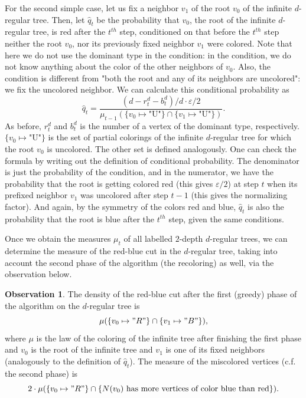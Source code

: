 \documentclass{article}
\theoremstyle{definition}
\newtheorem{observation}[definition]{Observation}
\newcommand{\eps}{\varepsilon}
\begin{document}
For the second simple case, let us fix a neighbor $v_1$ of the root $v_0$ of the infinite $d$-regular tree. Then, let $\hat q_t$ be the probability that $v_0$, the root of the infinite $d$-regular tree, is red after the $t^{th}$ step, conditioned on that before the $t^{th}$ step neither the root $v_0$, nor its previously fixed neighbor $v_1$ were colored. Note that here we do not use the dominant type in the condition: in the condition, we do not know anything about the color of the other neighbors of $v_0$. Also, the condition is different from "both the root and any of its neighbors are uncolored": we fix the uncolored neighbor. We can calculate this conditional probability as
$$\hat q_t=\frac{(d-r_t^d-b_t^d)/d\cdot\eps/2}{\mu_{t-1}(\{v_0\mapsto\text{"U"}\}\cap\{v_1\mapsto\text{"U"}\})}.$$
As before, $r_t^d$ and $b_t^d$ is the number of a vertex of the dominant type, respectively. $\{v_0\mapsto\text{"U"}\}$ is the set of partial colorings of the infinite $d$-regular tree for which the root $v_0$ is uncolored. The other set is defined analogously. One can check the formula by writing out the definition of conditional probability. The denominator is just the probability of the condition, and in the numerator, we have the probability that the root is getting colored red (this gives $\eps/2$) at step $t$ when its prefixed neighbor $v_1$ was uncolored after step $t-1$ (this gives the normalizing factor). And again, by the symmetry of the colors red and blue, $\hat q_t$ is also the probability that the root is blue after the $t^{th}$ step, given the same conditions.

Once we obtain the measures $\mu_t$ of all labelled $2$-depth $d$-regular trees, we can determine the measure of the red-blue cut in the $d$-regular tree, taking into account the second phase of the algorithm (the recoloring) as well, via the observation below.

\begin{observation}
The density of the red-blue cut after the first (greedy) phase of the algorithm on the $d$-regular tree is $$\mu(\{v_0\mapsto "R"\}\cap\{v_1\mapsto "B"\}),$$ where $\mu$ is the law of the coloring of the infinite tree after finishing the first phase and $v_0$ is the root of the infinite tree and $v_1$ is one of its fixed neighbors (analogously to the definition of $\hat q_t$).
The measure of the miscolored vertices (c.f. the second phase) is $$2\cdot\mu(\{v_0\mapsto "R"\}\cap\{N(v_0)\text{ has more vertices of color blue than red}\}).$$
\end{observation}
\end{document}
